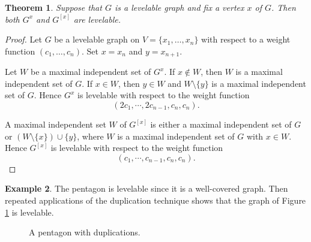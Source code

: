 \documentclass[12pt]{amsart}
\numberwithin{equation}{section}
\newtheorem{theorem}{Theorem}[section]
\theoremstyle{definition}
\newtheorem{example}[theorem]{Example}
\newcounter{i} %
\begin{document}
\begin{theorem}
Suppose that $G$ is a levelable graph and fix a vertex $x$ of $G$.  Then both $G^x$ and $G^{[x]}$ are levelable.  
\end{theorem}

\begin{proof}
Let $G$ be a levelable graph on $V = \{x_1, \ldots, x_n\}$ with respect to a weight function $(c_1, \ldots, c_n)$.  Set $x=x_n$ and $y=x_{n+1}$.

Let $W$ be a maximal independent set  of $G^x$.  If $x \not\in W$, then $W$ is a maximal independent set of $G$.  If $x \in W$, then $y \in W$ and $W \setminus \{y\}$ is a maximal independent set of $G$.  Hence $G^x$ is levelable with respect to the weight function
\[
(2c_1,\cdots, 2c_{n-1}, c_n, c_n).
\]



A maximal independent set $W$ of $G^{[x]}$ is either a maximal independent set of $G$ or $(W \setminus \{x\}) \cup \{y\}$, where $W$ is a maximal independent set of $G$ with $x \in W$.
Hence $G^{[x]}$ is levelable with respect to the weight function
\[
(c_1,\cdots, c_{n-1}, c_n, c_n).
\]
\end{proof}

\begin{example}
The pentagon is levelable since it is a well-covered graph.  Then repeated applications of the duplication technique shows that the graph of Figure \ref{fig:Pentagon} is levelable.
\end{example}
\begin{figure}[h]
\centering
{}
\caption{A pentagon with duplications.} \label{fig:Pentagon}
\end{figure} 
\end{document}
